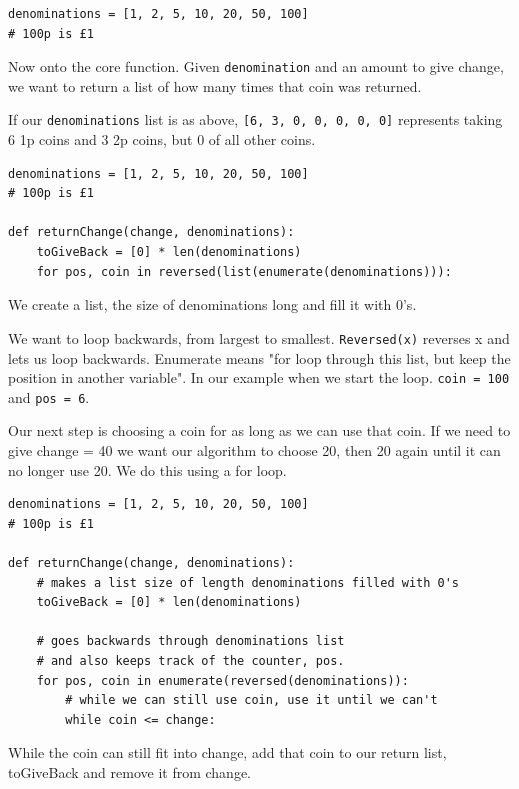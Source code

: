\documentclass{article}
\newcommand{\code}[1]{\texttt{#1}}
\begin{document}
 \begin{verbatim}
denominations = [1, 2, 5, 10, 20, 50, 100]
# 100p is £1
\end{verbatim}
 
 Now onto the core function. Given \code{denomination} and an amount to give change, we want to return a list of how many times that coin was returned. 
 
 If our \code{denominations} list is as above, \code{[6, 3, 0, 0, 0, 0, 0]} represents taking 6 1p coins and 3 2p coins, but 0 of all other coins.
 
 \begin{verbatim}
denominations = [1, 2, 5, 10, 20, 50, 100]
# 100p is £1

def returnChange(change, denominations):
	toGiveBack = [0] * len(denominations)
	for pos, coin in reversed(list(enumerate(denominations))):

\end{verbatim}
 We create a list, the size of denominations long and fill it with 0's. 
 
We want to loop backwards, from largest to smallest. \code{Reversed(x)} reverses x and lets us loop backwards. Enumerate means "for loop through this list, but keep the position in another variable". In our example when we start the loop. \code{coin = 100} and \code{pos = 6}.

Our next step is choosing a coin for as long as we can use that coin. If we need to give change = 40 we want our algorithm to choose 20, then 20 again until it can no longer use 20. We do this using a for loop. 
 \begin{verbatim}
denominations = [1, 2, 5, 10, 20, 50, 100]
# 100p is £1

def returnChange(change, denominations):
	# makes a list size of length denominations filled with 0's
	toGiveBack = [0] * len(denominations)

	# goes backwards through denominations list
	# and also keeps track of the counter, pos.
	for pos, coin in enumerate(reversed(denominations)):
		# while we can still use coin, use it until we can't
		while coin <= change:

\end{verbatim}
While the coin can still fit into change, add that coin to our return list, toGiveBack and remove it from change.
\end{document}
